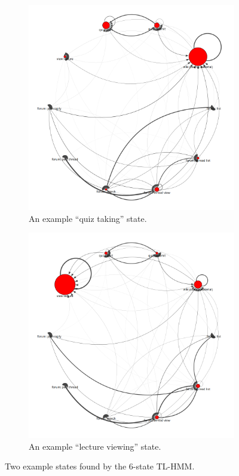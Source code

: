 \begin{figure}
  \centering
  \begin{subfigure}[t]{0.5\textwidth}
    \includegraphics[width=\textwidth]{figures/text-6state/state0.png}
    \caption{An example ``quiz taking'' state.}
    \label{fig:practice-quiz-state}
  \end{subfigure}%
  \begin{subfigure}[t]{0.5\textwidth}
    \includegraphics[width=\textwidth]{figures/text-6state/state1.png}
    \caption{An example ``lecture viewing'' state.}
    \label{fig:lecture-viewing-state}
  \end{subfigure}
  \caption{Two example states found by the 6-state TL-HMM.}
  \label{fig:states}
\end{figure}

